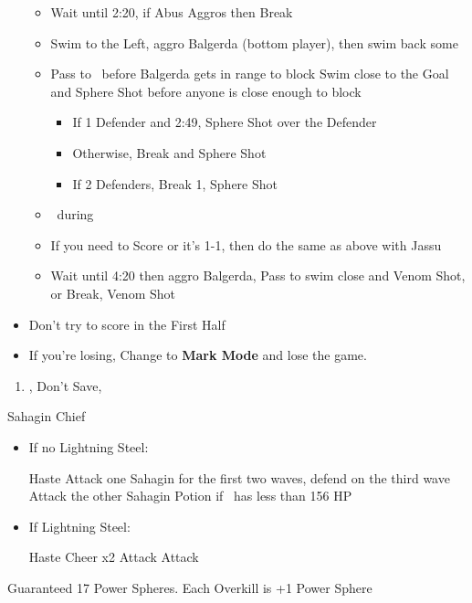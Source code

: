 \begin{blitzball}
\begin{itemize}
\begin{itemize}
			      \item Wait until 2:20, if Abus Aggros then Break
			      \item Swim to the Left, aggro Balgerda (bottom player), then swim back some
			      \item Pass to \tidus\ before Balgerda gets in range to block
			            \tidusf Swim close to the Goal and Sphere Shot before anyone is close enough to block
			            \begin{itemize}
				            \item If 1 Defender and 2:49, Sphere Shot over the Defender
				            \item Otherwise, Break and Sphere Shot
				            \item If 2 Defenders, Break 1, Sphere Shot
			            \end{itemize}
			      \item \sd\ during \wakka\ \cs
			      \item If you need to Score or it's 1-1, then do the same as above with Jassu
			      \item Wait until 4:20 then aggro Balgerda, Pass to \wakka
			            \wakkaf swim close and Venom Shot, or Break, Venom Shot
		      \end{itemize}
		\item Don't try to score in the First Half
		\item If you're losing, Change to \textbf{Mark Mode} and lose the game.
	\end{itemize}
\end{blitzball}
\begin{enumerate}[resume]
	\item \sd, Don't Save, \cs[1:00]
\end{enumerate}
\vfill
\begin{battle}{Sahagin Chief}
	\begin{itemize}
		\item{If no Lightning Steel:}
		      \begin{itemize}
			      \tidusf Haste \tidus
			      \wakkaf Attack one Sahagin for the first two waves, defend on the third wave
			      \tidusf Attack the other Sahagin
			      \wakkaf Potion if \tidus\ has less than 156 HP
		      \end{itemize}
		\item{If Lightning Steel:}
		      \begin{itemize}
			      \tidusf Haste \tidus
			      \tidusf Cheer x2
			      \wakkaf Attack
			      \tidusf Attack
		      \end{itemize}
	\end{itemize}
	Guaranteed 17 Power Spheres. Each Overkill is +1 Power Sphere
\end{battle}
